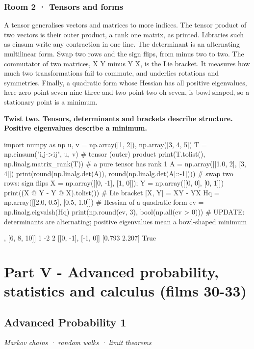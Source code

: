 \documentclass[11pt,a4paper]{report}
\begin{document}
\section*{Room 2 · Tensors and forms}
A tensor generalises vectors and matrices to more indices. The tensor product of two vectors is their outer product, a rank one matrix, as printed. Libraries such as einsum write any contraction in one line. The determinant is an alternating multilinear form. Swap two rows and the sign flips, from minus two to two. The commutator of two matrices, X Y minus Y X, is the Lie bracket. It measures how much two transformations fail to commute, and underlies rotations and symmetries. Finally, a quadratic form whose Hessian has all positive eigenvalues, here zero point seven nine three and two point two oh seven, is bowl shaped, so a stationary point is a minimum.
\begin{tcolorbox}[colback=yellow!12,colframe=orange!70!black,boxrule=0.4pt,left=4pt,right=4pt,top=2pt,bottom=2pt]\textbf{Twist two. Tensors, determinants and brackets describe structure. Positive eigenvalues describe a minimum.}\end{tcolorbox}
\begin{Code}
import numpy as np
u, v = np.array([1, 2]), np.array([3, 4, 5])
T = np.einsum("i,j->ij", u, v)             # tensor (outer) product
print(T.tolist(), np.linalg.matrix_rank(T))     # a pure tensor has rank 1
A = np.array([[1.0, 2], [3, 4]])
print(round(np.linalg.det(A)), round(np.linalg.det(A[::-1])))   # swap two rows: sign flips
X = np.array([[0, -1], [1, 0]]); Y = np.array([[0, 0], [0, 1]])
print((X @ Y - Y @ X).tolist())            # Lie bracket [X, Y] = XY - YX
Hq = np.array([[2.0, 0.5], [0.5, 1.0]])    # Hessian of a quadratic form
ev = np.linalg.eigvalsh(Hq)
print(np.round(ev, 3), bool(np.all(ev > 0)))
# UPDATE: determinants are alternating; positive eigenvalues mean a bowl-shaped minimum
\end{Code}
\begin{Out}
[[3, 4, 5], [6, 8, 10]] 1
-2 2
[[0, -1], [-1, 0]]
[0.793 2.207] True
\end{Out}
\part*{Part V - Advanced probability, statistics and calculus (films 30-33)}
\chapter{Advanced Probability 1}
\textit{Markov chains · random walks · limit theorems}
\end{document}
